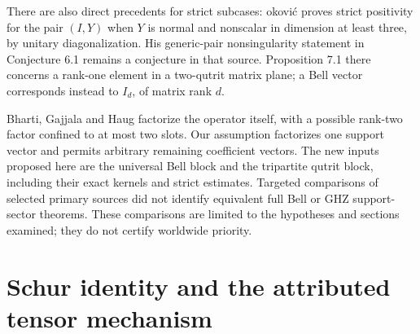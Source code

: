 \documentclass[11pt,a4paper]{article}
\begin{document}
There are also direct precedents for strict subcases: \DJ okovi\'c \cite[Theorem 5.1 and Proposition 4.2]{djokovic} proves strict positivity for the pair $(I,Y)$ when $Y$ is normal and nonscalar in dimension at least three, by unitary diagonalization. His generic-pair nonsingularity statement in Conjecture 6.1 remains a conjecture in that source. Proposition 7.1 there concerns a rank-one element in a two-qutrit matrix plane; a Bell vector corresponds instead to $I_d$, of matrix rank $d$.

Bharti, Gajjala and Haug \cite[Section 8]{bharti} factorize the operator itself, with a possible rank-two factor confined to at most two slots. Our assumption factorizes one support vector and permits arbitrary remaining coefficient vectors. The new inputs proposed here are the universal Bell block and the tripartite qutrit block, including their exact kernels and strict estimates. Targeted comparisons of selected primary sources did not identify equivalent full Bell or GHZ support-sector theorems. These comparisons are limited to the hypotheses and sections examined; they do not certify worldwide priority.

\section{Schur identity and the attributed tensor mechanism}
\end{document}
